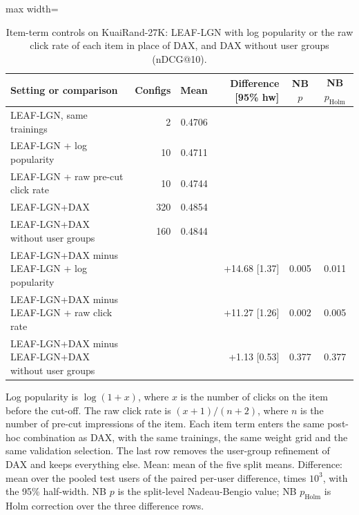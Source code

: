\begin{table}[tbp]
\centering
\footnotesize
\caption{Item-term controls on KuaiRand-27K: LEAF-LGN with log popularity or the raw click rate of each item in place of DAX, and DAX without user groups (nDCG@10).}
\label{tab:item}
\begin{adjustbox}{max width=\linewidth}
\begin{tabular}{lrrrcc}
\toprule
Setting or comparison & Configs & Mean & Difference [95\% hw] & NB $p$ & NB $p_{\mathrm{Holm}}$ \\
\midrule
LEAF-LGN, same trainings & 2 & 0.4706 &  &  &  \\
LEAF-LGN + log popularity & 10 & 0.4711 &  &  &  \\
LEAF-LGN + raw pre-cut click rate & 10 & 0.4744 &  &  &  \\
\midrule
LEAF-LGN+DAX & 320 & 0.4854 &  &  &  \\
LEAF-LGN+DAX without user groups & 160 & 0.4844 &  &  &  \\
\midrule
LEAF-LGN+DAX minus LEAF-LGN + log popularity &  &  & +14.68 [1.37] & 0.005 & 0.011 \\
LEAF-LGN+DAX minus LEAF-LGN + raw click rate &  &  & +11.27 [1.26] & 0.002 & 0.005 \\
LEAF-LGN+DAX minus LEAF-LGN+DAX without user groups &  &  & +1.13 [0.53] & 0.377 & 0.377 \\
\bottomrule
\end{tabular}
\end{adjustbox}
\par\smallskip
\begin{minipage}{\linewidth}\raggedright\footnotesize Log popularity is $\log(1+x)$, where $x$ is the number of clicks on the item before the cut-off. The raw click rate is $(x+1)/(n+2)$, where $n$ is the number of pre-cut impressions of the item. Each item term enters the same post-hoc combination as DAX, with the same trainings, the same weight grid and the same validation selection. The last row removes the user-group refinement of DAX and keeps everything else. Mean: mean of the five split means. Difference: mean over the pooled test users of the paired per-user difference, times $10^{3}$, with the 95\% half-width. NB $p$ is the split-level Nadeau-Bengio value; NB $p_{\mathrm{Holm}}$ is Holm correction over the three difference rows.\end{minipage}
\end{table}
